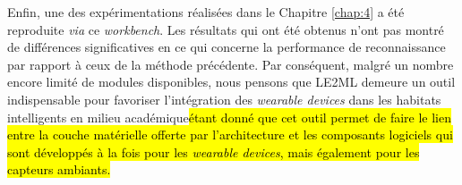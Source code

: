 Enfin, une des expérimentations réalisées dans le Chapitre \ref{chap:4} a été reproduite \textit{via} ce \textit{workbench}. Les résultats qui ont été obtenus n'ont pas montré de différences significatives en ce qui concerne la performance de reconnaissance par rapport à ceux de la méthode précédente. Par conséquent, malgré un nombre encore limité de modules disponibles, nous pensons que \acs{LE2ML} demeure un outil indispensable pour favoriser l'intégration des \textit{wearable devices} dans les habitats intelligents en milieu académique\hl{\textemdash étant donné que cet outil permet de faire le lien entre la couche matérielle offerte par l'architecture et les composants logiciels qui sont développés à la fois pour les \textit{wearable devices}, mais également pour les capteurs ambiants.}
